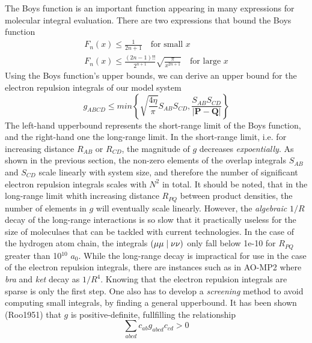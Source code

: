 \noindent The Boys function is an important function appearing in many expressions for molecular integral evaluation. There are two expressions that bound the Boys function
\begin{equation}
\begin{split}
F_n(x) \leq \frac{1}{2n+1} \quad \textrm{for small } x \\
F_n(x) \leq \frac{(2n-1)!!}{2^{n+1}}\sqrt{\frac{\pi}{x^{2n+1}}} \quad \textrm{for large } x 
\end{split}
\end{equation}
\noindent Using the Boys function's upper bounds, we can derive an upper bound for the electron repulsion integrals of our model system
\begin{equation}
g_{ABCD} \leq min \left\lbrace \sqrt{\frac{4\eta}{\pi}} S_{AB} S_{CD}, \frac{S_{AB} S_{CD}}{\left\lvert \mathbf{P} - \mathbf{Q} \right\rvert} \right\rbrace
\end{equation}
\noindent The left-hand upperbound represents the short-range limit of the Boys function, and the right-hand one the long-range limit. In the short-range limit, i.e. for increasing distance $R_{AB}$ or $R_{CD}$, the magnitude of $g$ decreases \emph{expoentially}. As shown in the previous section, the non-zero elements of the overlap integrals $S_{AB}$ and $S_{CD}$ scale linearly with system size, and therefore the number of significant electron repulsion integrals scales with $N^2$ in total. 
It should be noted, that in the long-range limit whith increasing distance $R_{PQ}$ between product densities, the number of elements in $g$ will eventually scale linearly. However, the \emph{algebraic} $1/R$ decay of the long-range interactions is so slow that it practically useless for the size of moleculaes that can be tackled with current technologies. In the case of the hydrogen atom chain, the integrals $\left( \mu\mu \mid \nu\nu \right)$ only fall below 1e-10 for $R_{PQ}$ greater than 10$^{10}$ $a_0$. While the long-range decay is impractical for use in the case of the electron repulsion integrals, there are instances such as in AO-MP2 where \emph{bra} and \emph{ket} decay as $1/R^4$.
Knowing that the electron repulsion integrals are sparse is only the first step. One also has to develop a \emph{screening} method to avoid computing small integrals, by finding a general upperbound. It has been shown (Roo1951) that $g$ is positive-definite, fullfilling the relationship
\begin{equation}
\sum_{abcd} c_{ab} g_{abcd} c_{cd} > 0
\end{equation}

